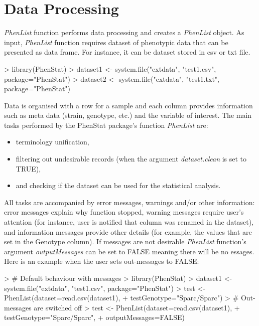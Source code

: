 \documentclass[a4paper]{article}
\begin{document}
\section{Data Processing}
\textit{PhenList} function performs data processing and creates a \textit{PhenList} object. 
As input, \textit{PhenList} function requires dataset of phenotypic data that can be presented as data frame. For instance, it can be dataset stored in csv or txt file.

\begin{Schunk}
\begin{Sinput}
> library(PhenStat)
> dataset1 <- system.file("extdata", "test1.csv", package="PhenStat")
> dataset2 <- system.file("extdata", "test1.txt", package="PhenStat")
\end{Sinput}
\end{Schunk}
Data is organised with a row for a sample and each column provides information such as meta data (strain, genotype, etc.) and the variable of interest.
\newline
The main tasks performed by the PhenStat package's function \textit{PhenList} are:
\begin{itemize}
\item terminology unification,
\item filtering out undesirable records (when the argument \textit{dataset.clean} is set to TRUE),
\item and checking if the dataset can be used for the statistical analysis.
\end{itemize}
All tasks are accompanied by error messages, warnings and/or other information: error messages explain why function stopped, 
warning messages require user's attention (for instance, user is notified that column was renamed in the dataset), and information messages provide other details (for example, the values that are set in the Genotype column). 
If messages are not desirable \textit{PhenList} function's argument \textit{outputMessages} can be set to FALSE meaning there will be no essages.
\newline\newline
Here is an example when the user sets out-messages to FALSE: 
\begin{Schunk}
\begin{Sinput}
> # Default behaviour with messages
> library(PhenStat)
> dataset1 <- system.file("extdata", "test1.csv", package="PhenStat")
> test <- PhenList(dataset=read.csv(dataset1),
+         testGenotype="Sparc/Sparc")
> # Out-messages are switched off 
> test <- PhenList(dataset=read.csv(dataset1),
+         testGenotype="Sparc/Sparc",
+         outputMessages=FALSE)
\end{Sinput}
\end{Schunk}
\end{document}
